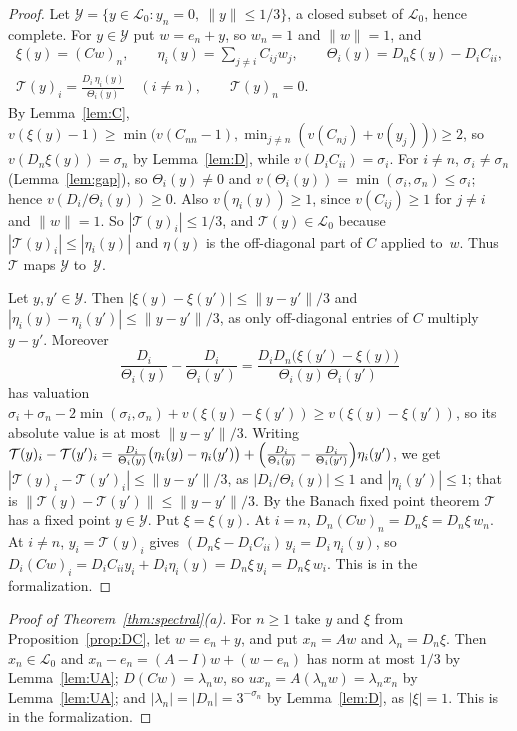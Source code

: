 \documentclass[11pt]{amsart}
\theoremstyle{definition}
\numberwithin{equation}{section}
\newcommand{\Lc}{\mathcal{L}_0}
\newcommand{\sig}{\sigma}
\begin{document}
\begin{proof}
Let $\mathcal Y=\{y\in\Lc:y_n=0,\ \|y\|\le1/3\}$, a closed subset of $\Lc$, hence complete. For $y\in\mathcal Y$ put $w=e_n+y$, so $w_n=1$ and $\|w\|=1$, and
\begin{gather*}
\xi(y)=(Cw)_n,\qquad \eta_i(y)=\sum_{j\ne i}C_{ij}w_j,\qquad \Theta_i(y)=D_n\xi(y)-D_iC_{ii},\\
\mathcal T(y)_i=\frac{D_i\,\eta_i(y)}{\Theta_i(y)}\quad(i\ne n),\qquad \mathcal T(y)_n=0.
\end{gather*}
By Lemma~\ref{lem:C}, $v(\xi(y)-1)\ge\min\bigl(v(C_{nn}-1),\min_{j\ne n}(v(C_{nj})+v(y_j))\bigr)\ge2$, so $v(D_n\xi(y))=\sig_n$ by Lemma~\ref{lem:D}, while $v(D_iC_{ii})=\sig_i$. For $i\ne n$, $\sig_i\ne\sig_n$ (Lemma~\ref{lem:gap}), so $\Theta_i(y)\ne0$ and $v(\Theta_i(y))=\min(\sig_i,\sig_n)\le\sig_i$; hence $v(D_i/\Theta_i(y))\ge0$. Also $v(\eta_i(y))\ge1$, since $v(C_{ij})\ge1$ for $j\ne i$ and $\|w\|=1$. So $|\mathcal T(y)_i|\le1/3$, and $\mathcal T(y)\in\Lc$ because $|\mathcal T(y)_i|\le|\eta_i(y)|$ and $\eta(y)$ is the off-diagonal part of $C$ applied to~$w$. Thus $\mathcal T$ maps $\mathcal Y$ to~$\mathcal Y$.

Let $y,y'\in\mathcal Y$. Then $|\xi(y)-\xi(y')|\le\|y-y'\|/3$ and $|\eta_i(y)-\eta_i(y')|\le\|y-y'\|/3$, as only off-diagonal entries of $C$ multiply $y-y'$. Moreover
\[
\frac{D_i}{\Theta_i(y)}-\frac{D_i}{\Theta_i(y')}=\frac{D_iD_n\bigl(\xi(y')-\xi(y)\bigr)}{\Theta_i(y)\,\Theta_i(y')}
\]
has valuation $\sig_i+\sig_n-2\min(\sig_i,\sig_n)+v(\xi(y)-\xi(y'))\ge v(\xi(y)-\xi(y'))$, so its absolute value is at most $\|y-y'\|/3$. Writing $\mathcal T(y)_i-\mathcal T(y')_i=\frac{D_i}{\Theta_i(y)}\bigl(\eta_i(y)-\eta_i(y')\bigr)+\Bigl(\frac{D_i}{\Theta_i(y)}-\frac{D_i}{\Theta_i(y')}\Bigr)\eta_i(y')$, we get $|\mathcal T(y)_i-\mathcal T(y')_i|\le\|y-y'\|/3$, as $|D_i/\Theta_i(y)|\le1$ and $|\eta_i(y')|\le1$; that is $\|\mathcal T(y)-\mathcal T(y')\|\le\|y-y'\|/3$. By the Banach fixed point theorem $\mathcal T$ has a fixed point $y\in\mathcal Y$. Put $\xi=\xi(y)$. At $i=n$, $D_n(Cw)_n=D_n\xi=D_n\xi\,w_n$. At $i\ne n$, $y_i=\mathcal T(y)_i$ gives $(D_n\xi-D_iC_{ii})\,y_i=D_i\,\eta_i(y)$, so $D_i(Cw)_i=D_iC_{ii}y_i+D_i\eta_i(y)=D_n\xi\,y_i=D_n\xi\,w_i$. This is  in the formalization.
\end{proof}

\begin{proof}[Proof of Theorem~\textup{\ref{thm:spectral}(a)}]
For $n\ge1$ take $y$ and $\xi$ from Proposition~\ref{prop:DC}, let $w=e_n+y$, and put $x_n=Aw$ and $\lambda_n=D_n\xi$. Then $x_n\in\Lc$ and $x_n-e_n=(A-I)w+(w-e_n)$ has norm at most $1/3$ by Lemma~\ref{lem:UA}; $D(Cw)=\lambda_nw$, so $ux_n=A(\lambda_nw)=\lambda_nx_n$ by Lemma~\ref{lem:UA}; and $|\lambda_n|=|D_n|=3^{-\sig_n}$ by Lemma~\ref{lem:D}, as $|\xi|=1$. This is  in the formalization.
\end{proof}
\end{document}
